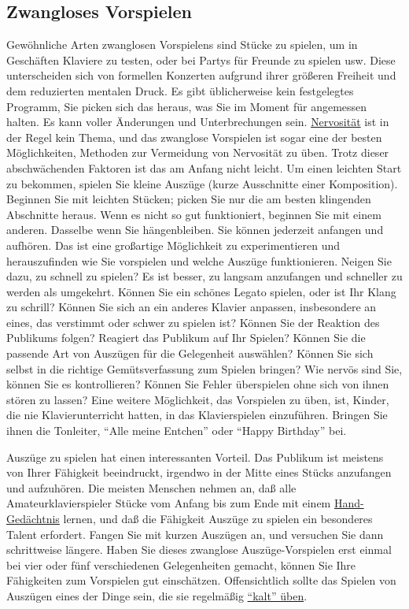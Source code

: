 
\subsection{Zwangloses Vorspielen}
\label{c1iii14e}

Gewöhnliche Arten zwanglosen Vorspielens sind Stücke zu spielen, um in Geschäften Klaviere zu testen, oder bei Partys für Freunde zu spielen usw.
Diese unterscheiden sich von formellen Konzerten aufgrund ihrer größeren Freiheit und dem reduzierten mentalen Druck.
Es gibt üblicherweise kein festgelegtes Programm, Sie picken sich das heraus, was Sie im Moment für angemessen halten.
Es kann voller Änderungen und Unterbrechungen sein.
\hyperref[c1iii15]{Nervosität} ist in der Regel kein Thema, und das zwanglose Vorspielen ist sogar eine der besten Möglichkeiten, Methoden zur Vermeidung von Nervosität zu üben.
Trotz dieser abschwächenden Faktoren ist das am Anfang nicht leicht.
Um einen leichten Start zu bekommen, spielen Sie kleine Auszüge (kurze Ausschnitte einer Komposition).
Beginnen Sie mit leichten Stücken; picken Sie nur die am besten klingenden Abschnitte heraus.
Wenn es nicht so gut funktioniert, beginnen Sie mit einem anderen. Dasselbe wenn Sie hängenbleiben.
Sie können jederzeit anfangen und aufhören.
Das ist eine großartige Möglichkeit zu experimentieren und herauszufinden wie Sie vorspielen und welche  Auszüge funktionieren.
Neigen Sie dazu, zu schnell zu spielen?
Es ist besser, zu langsam anzufangen und schneller zu werden als umgekehrt.
Können Sie ein schönes Legato spielen, oder ist Ihr Klang zu schrill?
Können Sie sich an ein anderes Klavier anpassen, insbesondere an eines, das verstimmt oder schwer zu spielen ist?
Können Sie der Reaktion des Publikums folgen?
Reagiert das Publikum auf Ihr Spielen?
Können Sie die passende Art von Auszügen für die Gelegenheit auswählen?
Können Sie sich selbst in die richtige Gemütsverfassung zum Spielen bringen?
Wie nervös sind Sie, können Sie es kontrollieren?
Können Sie Fehler überspielen ohne sich von ihnen stören zu lassen?
Eine weitere Möglichkeit, das Vorspielen zu üben, ist, Kinder, die nie Klavierunterricht hatten, in das Klavierspielen einzuführen.
Bringen Sie ihnen die Tonleiter, \enquote{Alle meine Entchen} oder \enquote{Happy Birthday} bei.

Auszüge zu spielen hat einen interessanten Vorteil. Das Publikum ist meistens von Ihrer Fähigkeit beeindruckt, irgendwo in der Mitte eines Stücks anzufangen und aufzuhören.
Die meisten Menschen nehmen an, daß alle Amateurklavierspieler Stücke vom Anfang bis zum Ende mit einem \hyperref[c1iii6d]{Hand-Gedächtnis} lernen, und daß die Fähigkeit Auszüge zu spielen ein besonderes Talent erfordert.
Fangen Sie mit kurzen Auszügen an, und versuchen Sie dann schrittweise längere.
Haben Sie dieses zwanglose Auszüge-Vorspielen erst einmal bei vier oder fünf verschiedenen Gelegenheiten gemacht, können Sie Ihre Fähigkeiten zum Vorspielen gut einschätzen.
Offensichtlich sollte das Spielen von Auszügen eines der Dinge sein, die sie regelmäßig \hyperref[c1iii6g]{\enquote{kalt} üben}.

